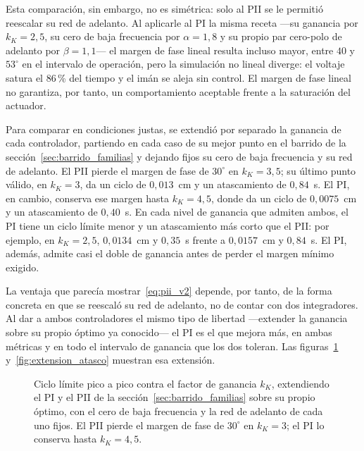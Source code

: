 Esta comparación, sin embargo, no es simétrica: solo al PII se le permitió reescalar su red de adelanto. Al aplicarle al PI la misma receta ---su ganancia por $k_K=2{,}5$, su cero de baja frecuencia por $\alpha=1{,}8$ y su propio par cero-polo de adelanto por $\beta=1{,}1$--- el margen de fase lineal resulta incluso mayor, entre $40$ y $53^\circ$ en el intervalo de operación, pero la simulación no lineal diverge: el voltaje satura el $86$\,\% del tiempo y el imán se aleja sin control. El margen de fase lineal no garantiza, por tanto, un comportamiento aceptable frente a la saturación del actuador.

Para comparar en condiciones justas, se extendió por separado la ganancia de cada controlador, partiendo en cada caso de su mejor punto en el barrido de la sección~\ref{sec:barrido_familias} y dejando fijos su cero de baja frecuencia y su red de adelanto. El PII pierde el margen de fase de $30^\circ$ en $k_K=3{,}5$; su último punto válido, en $k_K=3$, da un ciclo de $0{,}013$~cm y un atascamiento de $0{,}84$~s. El PI, en cambio, conserva ese margen hasta $k_K=4{,}5$, donde da un ciclo de $0{,}0075$~cm y un atascamiento de $0{,}40$~s. En cada nivel de ganancia que admiten ambos, el PI tiene un ciclo límite menor y un atascamiento más corto que el PII: por ejemplo, en $k_K=2{,}5$, $0{,}0134$~cm y $0{,}35$~s frente a $0{,}0157$~cm y $0{,}84$~s. El PI, además, admite casi el doble de ganancia antes de perder el margen mínimo exigido.

La ventaja que parecía mostrar~\eqref{eq:pii_v2} depende, por tanto, de la forma concreta en que se reescaló su red de adelanto, no de contar con dos integradores. Al dar a ambos controladores el mismo tipo de libertad ---extender la ganancia sobre su propio óptimo ya conocido--- el PI es el que mejora más, en ambas métricas y en todo el intervalo de ganancia que los dos toleran. Las figuras~\ref{fig:extension_ciclo} y~\ref{fig:extension_atasco} muestran esa extensión.

\begin{figure}[ht]
    \centering
    
    \caption[Ciclo límite al extender la ganancia]{Ciclo límite pico a pico contra el factor de ganancia $k_K$, extendiendo el PI y el PII de la sección~\ref{sec:barrido_familias} sobre su propio óptimo, con el cero de baja frecuencia y la red de adelanto de cada uno fijos. El PII pierde el margen de fase de $30^\circ$ en $k_K=3$; el PI lo conserva hasta $k_K=4{,}5$.}
    \label{fig:extension_ciclo}
\end{figure}

